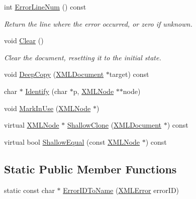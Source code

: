 \begin{DoxyCompactItemize}
int \mbox{\hyperlink{classtinyxml2_1_1_x_m_l_document_a57400f816dbe7799ece33615ead9ab76}{Error\+Line\+Num}} () const
\begin{DoxyCompactList}\small\item\em Return the line where the error occurred, or zero if unknown. \end{DoxyCompactList}\item 
void \mbox{\hyperlink{classtinyxml2_1_1_x_m_l_document_a65656b0b2cbc822708eb351504178aaf}{Clear}} ()
\begin{DoxyCompactList}\small\item\em Clear the document, resetting it to the initial state. \end{DoxyCompactList}\item 
void \mbox{\hyperlink{classtinyxml2_1_1_x_m_l_document_af592ffc91514e25a39664521ac83db45}{Deep\+Copy}} (\mbox{\hyperlink{classtinyxml2_1_1_x_m_l_document}{X\+M\+L\+Document}} $\ast$target) const
\item 
char $\ast$ \mbox{\hyperlink{classtinyxml2_1_1_x_m_l_document_a25827d1bec509ad566a107e5853ed040}{Identify}} (char $\ast$p, \mbox{\hyperlink{classtinyxml2_1_1_x_m_l_node}{X\+M\+L\+Node}} $\ast$$\ast$node)
\item 
void \mbox{\hyperlink{classtinyxml2_1_1_x_m_l_document_a95d28ecb4760a994556b0a51690b21be}{Mark\+In\+Use}} (\mbox{\hyperlink{classtinyxml2_1_1_x_m_l_node}{X\+M\+L\+Node}} $\ast$)
\item 
virtual \mbox{\hyperlink{classtinyxml2_1_1_x_m_l_node}{X\+M\+L\+Node}} $\ast$ \mbox{\hyperlink{classtinyxml2_1_1_x_m_l_document_aa37cc1709d7e1e988bc17dcfb24a69b8}{Shallow\+Clone}} (\mbox{\hyperlink{classtinyxml2_1_1_x_m_l_document}{X\+M\+L\+Document}} $\ast$) const
\item 
virtual bool \mbox{\hyperlink{classtinyxml2_1_1_x_m_l_document_a6fe5ef18699091844fcf64b56ffa5bf9}{Shallow\+Equal}} (const \mbox{\hyperlink{classtinyxml2_1_1_x_m_l_node}{X\+M\+L\+Node}} $\ast$) const
\end{DoxyCompactItemize}
\subsection*{Static Public Member Functions}
\begin{DoxyCompactItemize}
\item 
static const char $\ast$ \mbox{\hyperlink{classtinyxml2_1_1_x_m_l_document_a639f7c295c38dc5a4aafeb2fff93da03}{Error\+I\+D\+To\+Name}} (\mbox{\hyperlink{namespacetinyxml2_a1fbf88509c3ac88c09117b1947414e08}{X\+M\+L\+Error}} error\+ID)
\end{DoxyCompactItemize}

